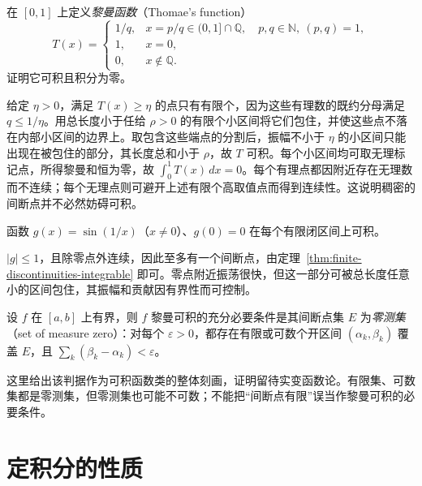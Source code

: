 \documentclass[UTF8,12pt,a4paper,fontset=fandol]{ctexbook}
\begin{document}
\begin{example}
\label{ex:thomae-function-riemann-integrable}
在 $[0,1]$ 上定义\emph{黎曼函数}（Thomae's function）
\[
    T(x)=
    \begin{cases}
        1/q,&x=p/q\in(0,1]\cap\mathbb Q,\quad p,q\in\mathbb N,\ (p,q)=1,\\
        1,&x=0,\\
        0,&x\notin\mathbb Q.
    \end{cases}
\]
证明它可积且积分为零。
\end{example}
\begin{solve}
给定 $\eta>0$，满足 $T(x)\geq\eta$ 的点只有有限个，因为这些有理数的既约分母满足 $q\leq1/\eta$。用总长度小于任给 $\rho>0$ 的有限个小区间将它们包住，并使这些点不落在内部小区间的边界上。取包含这些端点的分割后，振幅不小于 $\eta$ 的小区间只能出现在被包住的部分，其长度总和小于 $\rho$，故 $T$ 可积。每个小区间均可取无理标记点，所得黎曼和恒为零，故 $\int_0^1T(x)\,dx=0$。每个有理点都因附近存在无理数而不连续；每个无理点则可避开上述有限个高取值点而得到连续性。这说明稠密的间断点并不必然妨碍可积。
\end{solve}

\begin{example}
\label{ex:oscillatory-sine-riemann-integrable}
函数 $g(x)=\sin(1/x)$（$x\neq0$）、$g(0)=0$ 在每个有限闭区间上可积。
\end{example}
\begin{solve}
$|g|\leq1$，且除零点外连续，因此至多有一个间断点，由定理~\ref{thm:finite-discontinuities-integrable} 即可。零点附近振荡很快，但这一部分可被总长度任意小的区间包住，其振幅和贡献因有界性而可控制。
\end{solve}

\begin{theorem}[勒贝格可积性判据]
\label{thm:lebesgue-criterion-riemann-integrability}
设 $f$ 在 $[a,b]$ 上有界，则 $f$ 黎曼可积的充分必要条件是其间断点集 $E$ 为\emph{零测集}（set of measure zero）：对每个 $\varepsilon>0$，都存在有限或可数个开区间 $(\alpha_k,\beta_k)$ 覆盖 $E$，且 $\sum_k(\beta_k-\alpha_k)<\varepsilon$。
\end{theorem}

这里给出该判据作为可积函数类的整体刻画，证明留待实变函数论。有限集、可数集都是零测集，但零测集也可能不可数；不能把“间断点有限”误当作黎曼可积的必要条件。

\section{定积分的性质}
\label{sec:properties-of-definite-integrals}
\end{document}
